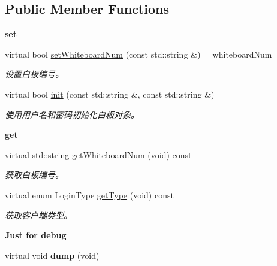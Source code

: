 \subsection*{\-Public \-Member \-Functions}
\begin{Indent}{\bf set}\par
\begin{DoxyCompactItemize}
\item 
virtual bool \hyperlink{classepWhiteBoard_aa4f5705948c452c34dcf9594bf58b805}{set\-Whiteboard\-Num} (const std\-::string \&) = whiteboard\-Num
\begin{DoxyCompactList}\small\item\em 设置白板编号。 \end{DoxyCompactList}\item 
virtual bool \hyperlink{classepWhiteBoard_a53a1e629a59eff2cf95a70cbc75b798a}{init} (const std\-::string \&, const std\-::string \&)
\begin{DoxyCompactList}\small\item\em 使用用户名和密码初始化白板对象。 \end{DoxyCompactList}\end{DoxyCompactItemize}
\end{Indent}
\begin{Indent}{\bf get}\par
\begin{DoxyCompactItemize}
\item 
virtual std\-::string \hyperlink{classepWhiteBoard_ab57465f3d8e945f005ee3e487e4bac15}{get\-Whiteboard\-Num} (void) const 
\begin{DoxyCompactList}\small\item\em 获取白板编号。 \end{DoxyCompactList}\item 
virtual enum \-Login\-Type \hyperlink{classepWhiteBoard_af53ead55f5630984a730edc745add5e1}{get\-Type} (void) const 
\begin{DoxyCompactList}\small\item\em 获取客户端类型。 \end{DoxyCompactList}\end{DoxyCompactItemize}
\end{Indent}
\begin{Indent}{\bf \-Just for debug}\par
\begin{DoxyCompactItemize}
\item 
\hypertarget{classepWhiteBoard_a619e84c470bc1639ad9fbd432b181c22}{virtual void {\bfseries dump} (void)}\label{classepWhiteBoard_a619e84c470bc1639ad9fbd432b181c22}

\end{DoxyCompactItemize}
\end{Indent}


